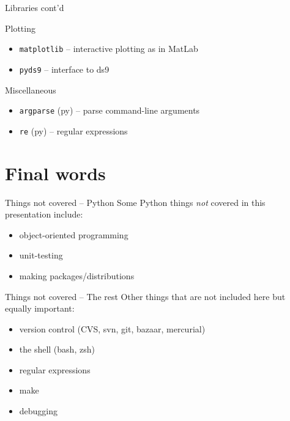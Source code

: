 \documentclass[xetex,10pt]{beamer}
\def\spacer{\vspace*{1em}}
\begin{document}
\begin{frame}[fragile]{Libraries cont'd}

Plotting
\begin{itemize}
\item \texttt{matplotlib} -- interactive plotting as in MatLab
\item \texttt{pyds9} -- interface to ds9
\end{itemize}

	\spacer
	\pause

Miscellaneous
\begin{itemize}
\item \texttt{argparse} (py) -- parse command-line arguments
\item \texttt{re} (py) -- regular expressions
\end{itemize}

\end{frame}

\section{Final words}

\begin{frame}[fragile]{Things not covered -- Python}
	Some Python things \emph{not} covered in this presentation include:
	\spacer
	\begin{itemize}
		\item object-oriented programming
		\item unit-testing
		\item making packages/distributions
	\end{itemize}
\end{frame}

\begin{frame}[fragile]{Things not covered -- The rest}
	Other things that are not included here but equally important:
	\spacer
	\begin{itemize}
		\item version control (CVS, svn, git, bazaar, mercurial)
		\item the shell (bash, zsh)
		\item regular expressions
		\item make
		\item debugging
	\end{itemize}
\end{frame}
\end{document}
